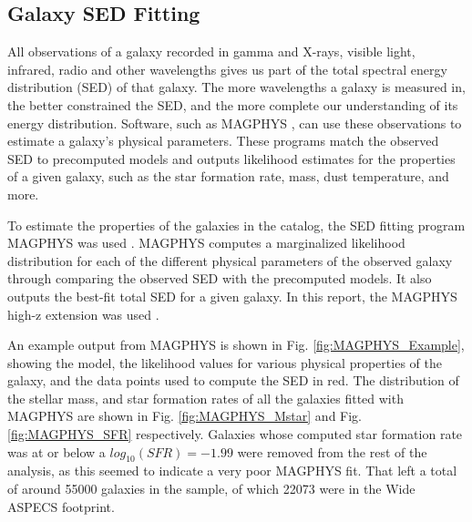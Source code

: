


\subsection{Galaxy SED Fitting}

All observations of a galaxy recorded in gamma and X-rays, visible light, infrared, radio and other wavelengths gives us part of the total spectral energy distribution (SED) of that galaxy. The more wavelengths a galaxy is measured in, the better constrained the SED, and the more complete our understanding of its energy distribution. Software, such as MAGPHYS \cite{da2008simple, da2015alma}, can use these observations to estimate a galaxy's physical parameters. These programs match the observed SED to precomputed models and outputs likelihood estimates for the properties of a given galaxy, such as the star formation rate, mass, dust temperature, and more.


To estimate the properties of the galaxies in the catalog, the SED fitting program MAGPHYS was used \cite{da2008simple, da2015alma}. MAGPHYS computes a marginalized likelihood distribution for each of the different physical parameters of the observed galaxy through comparing the observed SED with the precomputed models. It also outputs the best-fit total SED for a given galaxy. In this report, the MAGPHYS high-z extension was used \cite{da2015alma}. %

An example output from MAGPHYS is shown in Fig. \ref{fig:MAGPHYS_Example}, showing the model, the likelihood values for various physical properties of the galaxy, and the data points used to compute the SED in red. The distribution of the stellar mass, and star formation rates of all the galaxies fitted with MAGPHYS are shown in Fig. \ref{fig:MAGPHYS_Mstar} and Fig. \ref{fig:MAGPHYS_SFR} respectively. Galaxies whose computed star formation rate was at or below a $log_{10}(SFR) = -1.99$ were removed from the rest of the analysis, as this seemed to indicate a very poor MAGPHYS fit. That left a total of around 55000 galaxies in the sample, of which 22073 were in the Wide ASPECS footprint.


